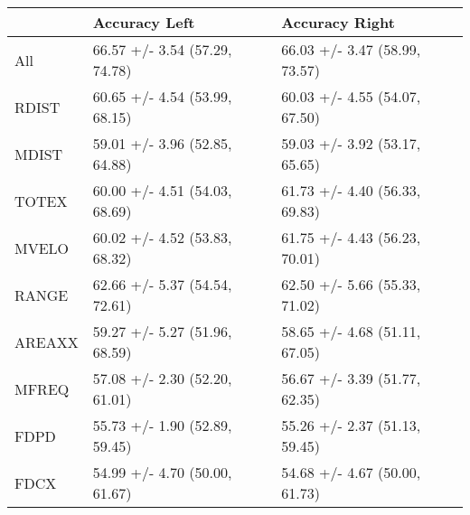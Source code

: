 \begin{tabular}{lll}
\toprule
{} &                  Accuracy Left &                 Accuracy Right \\
\midrule
All    &  66.57 +/- 3.54 (57.29, 74.78) &  66.03 +/- 3.47 (58.99, 73.57) \\
RDIST  &  60.65 +/- 4.54 (53.99, 68.15) &  60.03 +/- 4.55 (54.07, 67.50) \\
MDIST  &  59.01 +/- 3.96 (52.85, 64.88) &  59.03 +/- 3.92 (53.17, 65.65) \\
TOTEX  &  60.00 +/- 4.51 (54.03, 68.69) &  61.73 +/- 4.40 (56.33, 69.83) \\
MVELO  &  60.02 +/- 4.52 (53.83, 68.32) &  61.75 +/- 4.43 (56.23, 70.01) \\
RANGE  &  62.66 +/- 5.37 (54.54, 72.61) &  62.50 +/- 5.66 (55.33, 71.02) \\
AREAXX &  59.27 +/- 5.27 (51.96, 68.59) &  58.65 +/- 4.68 (51.11, 67.05) \\
MFREQ  &  57.08 +/- 2.30 (52.20, 61.01) &  56.67 +/- 3.39 (51.77, 62.35) \\
FDPD   &  55.73 +/- 1.90 (52.89, 59.45) &  55.26 +/- 2.37 (51.13, 59.45) \\
FDCX   &  54.99 +/- 4.70 (50.00, 61.67) &  54.68 +/- 4.67 (50.00, 61.73) \\
\bottomrule
\end{tabular}
